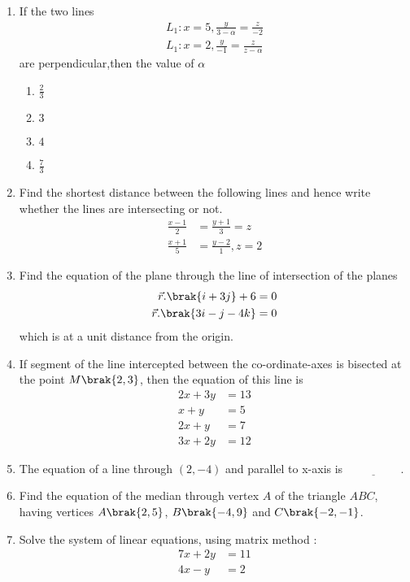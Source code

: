 \begin{enumerate}
    \item If the two lines
    \begin{align}
          L_1 : x=5,\frac{y}{3-\alpha}=\frac{z}{-2}\\
         L_1 : x=2,\frac{y}{-1}=\frac{z}{z-\alpha} 
       \end{align}
  are perpendicular,then the value of $\alpha$ 
        \begin{enumerate}
        \item $\frac{2}{3}$
        \item $3$
        \item $4$
        \item $\frac{7}{3}$
    \end{enumerate}

    \item Find the shortest distance between the following lines and hence write
whether the lines are intersecting or not.
\begin{align}
    \frac{x-1}{2} &= \frac{y+1}{3} = z \\
    \frac{x+1}{5} &=\frac{y-2}{1},z=2
\end{align}

\item  Find the equation of the plane through the line of intersection of the planes 
\begin{align}
     \vec{r} .\brak{i+3j} + 6 &= 0 \\  \vec{r} .\brak{3i - j - 4k} &= 0
\end{align}
which is at a unit distance from the origin.
    \item If segment of the line intercepted between the co-ordinate-axes is bisected
at the point $M\brak{2, 3}$, then the equation of this line is
 \begin{align}
       2x + 3y &= 13\\
       x + y &= 5 \\
       2x + y &= 7\\
       3x + 2y &= 12
\end{align}
\item The equation of a line through $(2,-4)$ and parallel to x-axis is $\underline{\hspace{2cm}}$.
\item Find the equation of the median through vertex $A$ of the triangle $ABC$, having vertices $A\brak{2,5}$, $B\brak{-4,9}$ and $C\brak{-2, -1}$.
\item Solve the system of linear equations, using matrix method : 
\begin{align}
  7x + 2y &= 11\\
 4x - y &= 2
\end{align}
\end{enumerate}
